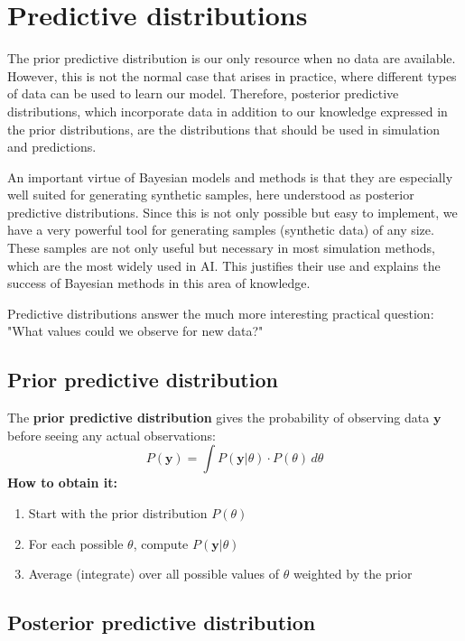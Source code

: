 \section{Predictive distributions}
The prior predictive distribution is our only resource when no data are available. However, this is not the normal case that arises in practice, where different types of data can be used to learn our model. Therefore, posterior predictive distributions, which incorporate data in addition to our knowledge expressed in the prior distributions, are the distributions that should be used in simulation and predictions.

An important virtue of Bayesian models and methods is that they are especially well suited for generating synthetic samples, here understood as posterior predictive distributions. Since this is not only possible but easy to implement, we have a very powerful tool for generating samples (synthetic data) of any size. These samples are not only useful but necessary in most simulation methods, which are the most widely used in AI. This justifies their use and explains the success of Bayesian methods in this area of knowledge.

Predictive distributions answer the much more interesting practical question: "What values could we observe for new data?"

\subsection{Prior predictive distribution}

The \textbf{prior predictive distribution} gives the probability of observing data $\mathbf{y}$ before seeing any actual observations:
\begin{equation}\label{eq:prior_predictive}
\boxed{P(\mathbf{y}) = \int P(\mathbf{y}|\theta) \cdot P(\theta) \, d\theta}
\end{equation}
\textbf{How to obtain it:}
\begin{enumerate}
\item Start with the prior distribution $P(\theta)$
\item For each possible $\theta$, compute $P(\mathbf{y}|\theta)$
\item Average (integrate) over all possible values of $\theta$ weighted by the prior
\end{enumerate}

\subsection{Posterior predictive distribution}

